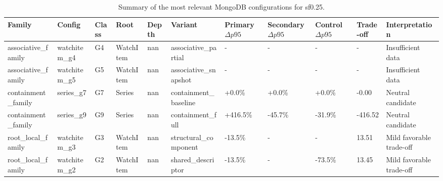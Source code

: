 \begin{table}[ht]
\centering
\caption{Summary of the most relevant MongoDB configurations for sf0.25.}
\label{tab:sf025_summary}
\scriptsize
\setlength{\tabcolsep}{4pt}
\begin{tabular}{p{2.4cm} p{1.8cm} p{1.2cm} p{1.4cm} p{0.9cm} p{2.2cm} p{1.6cm} p{1.7cm} p{1.6cm} p{1.3cm} p{3.2cm}}
\toprule
Family & Config & Class & Root & Depth & Variant & Primary $\Delta p95$ & Secondary $\Delta p95$ & Control $\Delta p95$ & Trade-off & Interpretation \\
\midrule
associative\_family & watchitem\_g4 & G4 & WatchItem & nan & associative\_partial & - & - & - & - & Insufficient data \\
associative\_family & watchitem\_g5 & G5 & WatchItem & nan & associative\_snapshot & - & - & - & - & Insufficient data \\
containment\_family & series\_g7 & G7 & Series & nan & containment\_baseline & +0.0\% & +0.0\% & +0.0\% & -0.00 & Neutral candidate \\
containment\_family & series\_g9 & G9 & Series & nan & containment\_full & +416.5\% & -45.7\% & -31.9\% & -416.52 & Neutral candidate \\
root\_local\_family & watchitem\_g3 & G3 & WatchItem & nan & structural\_component & -13.5\% & - & - & 13.51 & Mild favorable trade-off \\
root\_local\_family & watchitem\_g2 & G2 & WatchItem & nan & shared\_descriptor & -13.5\% & - & -73.5\% & 13.45 & Mild favorable trade-off \\
\bottomrule
\end{tabular}
\end{table}